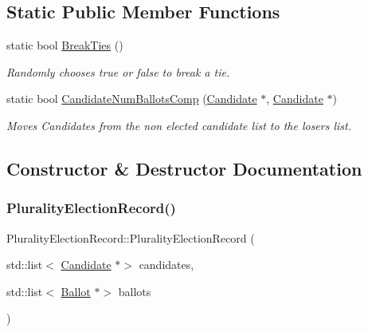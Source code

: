 \subsection*{Static Public Member Functions}
\begin{DoxyCompactItemize}
\item 
\mbox{\label{classPluralityElectionRecord_af157c9564184c444bcf8cab59b0ac07e}} 
static bool \hyperlink{classPluralityElectionRecord_af157c9564184c444bcf8cab59b0ac07e}{Break\+Ties} ()
\begin{DoxyCompactList}\small\item\em Randomly chooses true or false to break a tie. \end{DoxyCompactList}\item 
static bool \hyperlink{classPluralityElectionRecord_af7b9fef847ef615ff844912a1a851a62}{Candidate\+Num\+Ballots\+Comp} (\hyperlink{classCandidate}{Candidate} $\ast$, \hyperlink{classCandidate}{Candidate} $\ast$)
\begin{DoxyCompactList}\small\item\em Moves Candidates from the non elected candidate list to the losers list. \end{DoxyCompactList}\end{DoxyCompactItemize}


\subsection{Constructor \& Destructor Documentation}
\mbox{\label{classPluralityElectionRecord_a6cc4b921ebfed3f5003b3047fae68fc5}} 
\subsubsection{\texorpdfstring{Plurality\+Election\+Record()}{PluralityElectionRecord()}}
{\footnotesize\ttfamily Plurality\+Election\+Record\+::\+Plurality\+Election\+Record (\begin{DoxyParamCaption}\item[{std\+::list$<$ \hyperlink{classCandidate}{Candidate} $\ast$$>$}]{candidates,  }\item[{std\+::list$<$ \hyperlink{classBallot}{Ballot} $\ast$$>$}]{ballots }\end{DoxyParamCaption})\hspace{0.3cm}{\ttfamily [explicit]}}



